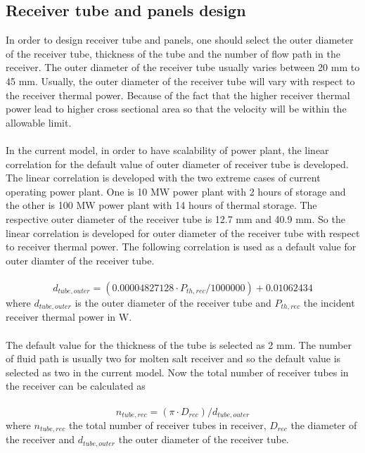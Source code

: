 \subsection{Receiver tube and panels design}
In order to design receiver tube and panels, one should select the outer diameter of the receiver tube, thickness of the tube and the number of flow path in the receiver. The outer diameter of the receiver tube usually varies between 20 mm to 45 mm. Usually, the outer diameter of the receiver tube will vary with respect to the receiver thermal power. Because of the fact that the higher receiver thermal power lead to higher cross sectional area so that the velocity will be within the allowable limit.\\\\
In the current model, in order to have scalability of power plant, the linear correlation for the default value of outer diameter of receiver tube is developed. The linear correlation is developed with the two extreme cases of current operating power plant. One is 10 MW power plant with 2 hours of storage and the other is 100 MW power plant with 14 hours of thermal storage. The respective outer diameter of the receiver tube is 12.7 mm and 40.9 mm. So the linear correlation is developed for outer diameter of the receiver tube with respect to receiver thermal power. The following correlation is used as a default value for outer diamter of the receiver tube. \\\\
\begin{equation}
	d_{tube,outer} = (0.00004827128 \cdot P_{th,rec}/1000000) + 0.01062434
\end{equation}
where $d_{tube,outer}$ is the outer diameter of the receiver tube and  $P_{th,rec}$ the incident receiver thermal power in W.\\\\
The default value for the thickness of the tube is selected as 2 mm. The number of fluid path is usually two for molten salt receiver and so the default value is selected as two in the current model. Now the total number of receiver tubes in the receiver can be calculated as\\\\
\begin{equation}
	n_{tube,rec} = (\pi \cdot D_{rec}) / d_{tube,outer}
\end{equation}
where $n_{tube,rec}$ the total number of receiver tubes in receiver, $D_{rec}$ the diameter of the receiver and $d_{tube,outer}$ the outer diameter of the receiver tube.\\\\
